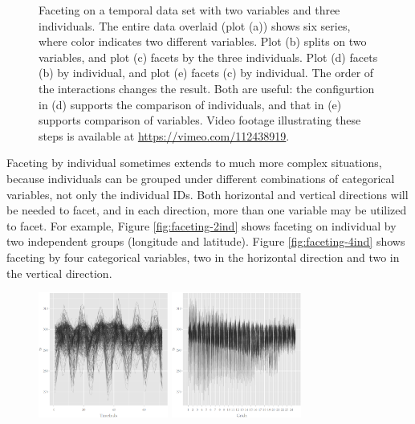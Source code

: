 \documentclass[12pt]{article}
\begin{document}
\begin{itemize}
\begin{center}
\begin{figure}[H]
\caption{\label{fig:faceting-var-ind}Faceting on a temporal data set with
two variables and three individuals. The entire data overlaid (plot (a)) shows six series, where color indicates two different variables. Plot (b) splits on two variables, and plot (c) facets by the three individuals. Plot (d) facets (b) by individual, and plot  (e) facets (c) by individual. The order of the interactions changes the result. Both are useful: the configurtion in (d) supports the comparison of individuals, and that in (e) supports comparison of variables.  Video footage illustrating these steps is available at \url{https://vimeo.com/112438919}.}
\end{figure}

\par\end{center}


Faceting by individual sometimes extends to much more complex situations,
because individuals can be grouped under different combinations of
categorical variables, not only the individual IDs. Both horizontal
and vertical directions will be needed to facet, and in each direction,
more than one variable may be utilized to facet. For example, Figure
\ref{fig:faceting-2ind} shows faceting on individual by two independent
groups  (longitude and latitude). Figure \ref{fig:faceting-4ind} shows
faceting by four categorical variables, two in the horizontal direction
and two in the vertical direction.


\begin{center}
\begin{figure}[H]
\begin{centering}
\includegraphics[width=0.38\textwidth]{graph/pipeline-24-1} \includegraphics[width=0.38\textwidth]{graph/pipeline-24-3}
\par\end{centering}


\end{figure}
\end{center}
\end{itemize}
\end{document}

